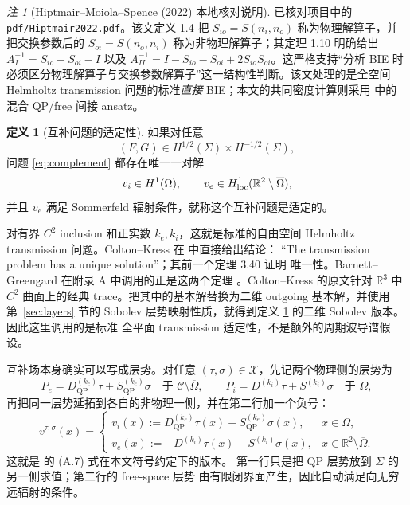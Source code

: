 \documentclass[UTF8,11pt,fontset=fandol]{ctexart}
\newcommand{\C}{\mathcal C}
\newcommand{\Om}{\Omega}
\newcommand{\Sig}{\Sigma}
\newcommand{\R}{\mathbb R}
\newcommand{\QP}{\mathrm{QP}}
\theoremstyle{plain}
\theoremstyle{definition}
\newtheorem{definition}[theorem]{定义}
\theoremstyle{remark}
\newtheorem{remark}[theorem]{注}
\begin{document}
\begin{remark}[Hiptmair--Moiola--Spence (2022) 本地核对说明]
已核对项目中的 \texttt{pdf/Hiptmair2022.pdf}。该文定义 1.4 把
\(S_{io}=S(n_i,n_o)\) 称为物理解算子，并把交换参数后的
\(S_{oi}=S(n_o,n_i)\) 称为非物理解算子；其定理 1.10 明确给出
\(A_I^{-1}=S_{io}+S_{oi}-I\) 以及
\(A_{II}^{-1}=I-S_{io}-S_{oi}+2S_{io}S_{oi}\)。这严格支持“分析 BIE
时必须区分物理解算子与交换参数解算子”这一结构性判断。该文处理的是全空间
Helmholtz transmission 问题的标准\emph{直接} BIE；本文的共同密度计算则采用
\cite[附录 A]{BarnettGreengard2010} 中的混合 QP/free 间接 ansatz。
\end{remark}

\begin{definition}[互补问题的适定性]
\label{def:complement-solvability}
如果对任意
\[
(F,G)\in H^{1/2}(\Sig)\times H^{-1/2}(\Sig),
\]
问题 \eqref{eq:complement} 都存在唯一一对解
\[
v_i\in H^1(\Om),\qquad
v_e\in H^1_{\rm loc}(\R^2\setminus\overline\Om),
\]
并且 \(v_e\) 满足 Sommerfeld 辐射条件，就称这个互补问题是适定的。
\end{definition}

对有界 \(C^2\) inclusion 和正实数 \(k_e,k_i\)，这就是标准的自由空间
Helmholtz transmission 问题。Colton--Kress 在
\cite[定理 3.41，第 101 页]{ColtonKress1983} 中直接给出结论：
``The transmission problem has a unique solution''；其前一个定理 3.40 证明
唯一性。Barnett--Greengard 在附录 A 中调用的正是这两个定理
\cite[第 22--24 页]{BarnettGreengard2010}。Colton--Kress 的原文针对
\(\R^3\) 中 \(C^2\) 曲面上的经典 trace。把其中的基本解替换为二维 outgoing
基本解，并使用第~\ref{sec:layers} 节的 Sobolev 层势映射性质，就得到定义
\ref{def:complement-solvability} 的二维 Sobolev 版本。因此这里调用的是标准
全平面 transmission 适定性，不是额外的周期波导谱假设。

互补场本身确实可以写成层势。对任意
\((\tau,\sigma)\in\mathcal X\)，先记两个物理侧的层势为
\begin{equation}
P_e=D_{\QP}^{(k_e)}\tau+S_{\QP}^{(k_e)}\sigma
\quad\text{于 }\C\setminus\overline\Om,
\qquad
P_i=D^{(k_i)}\tau+S^{(k_i)}\sigma
\quad\text{于 }\Om,
\label{eq:physical-potentials}
\end{equation}
再把同一层势延拓到各自的非物理一侧，并在第二行加一个负号：
\begin{equation}
v^{\tau,\sigma}(x)=
\begin{cases}
v_i(x):=D_{\QP}^{(k_e)}\tau(x)+S_{\QP}^{(k_e)}\sigma(x),
&x\in\Om,\\
v_e(x):=-D^{(k_i)}\tau(x)-S^{(k_i)}\sigma(x),
&x\in\R^2\setminus\overline\Om.
\end{cases}
\label{eq:complementary-layer}
\end{equation}
这就是 \cite{BarnettGreengard2010} 的 (A.7) 式在本文符号约定下的版本。
第一行只是把 QP 层势放到 \(\Sig\) 的另一侧求值；第二行的 free-space 层势
由有限闭界面产生，因此自动满足向无穷远辐射的条件。
\end{document}
